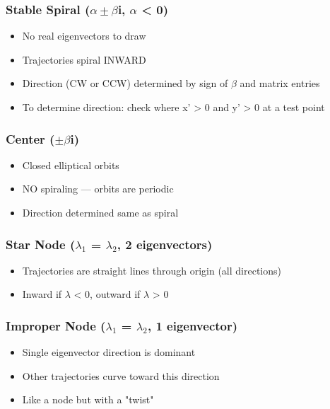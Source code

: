 \documentclass[12pt,a4paper,openany]{book}
\begin{document}
{{\subsubsection{Stable Spiral ($\alpha\pm\beta$i, $\alpha$ < 0)}
\begin{itemize}[leftmargin=*]
  \item No real eigenvectors to draw
  \item Trajectories spiral INWARD
  \item Direction (CW or CCW) determined by sign of $\beta$ and matrix entries
  \item To determine direction: check where x' > 0 and y' > 0 at a test point
\end{itemize}

\subsubsection{Center ($\pm\beta$i)}
\begin{itemize}[leftmargin=*]
  \item Closed elliptical orbits
  \item NO spiraling — orbits are periodic
  \item Direction determined same as spiral
\end{itemize}

\subsubsection{Star Node ($\lambda_1$ = $\lambda_2$, 2 eigenvectors)}
\begin{itemize}[leftmargin=*]
  \item Trajectories are straight lines through origin (all directions)
  \item Inward if $\lambda$ < 0, outward if $\lambda$ > 0
\end{itemize}

\subsubsection{Improper Node ($\lambda_1$ = $\lambda_2$, 1 eigenvector)}
\begin{itemize}[leftmargin=*]
  \item Single eigenvector direction is dominant
  \item Other trajectories curve toward this direction
  \item Like a node but with a "twist"
\end{itemize}

}}
\end{document}
